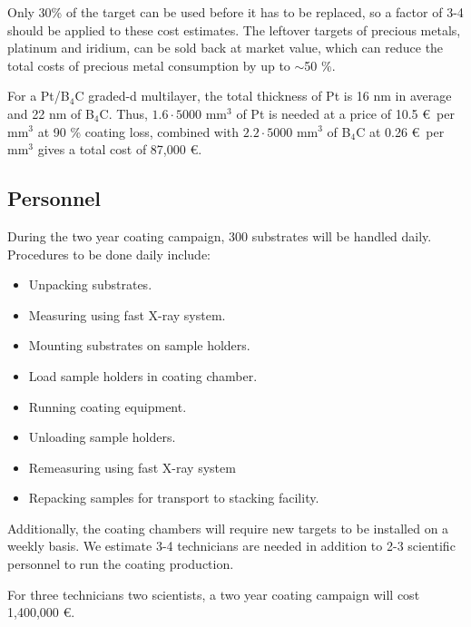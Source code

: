 Only 30\% of the target can be used before it has to be replaced, so a factor of 3-4 should be applied to these cost estimates. The leftover targets of precious metals, platinum and iridium, can be sold back at market value, which can reduce the total costs of precious metal consumption by up to $\sim$50 \%.

For a Pt/B$_4$C graded-d multilayer, the total thickness of Pt is 16 nm in average and 22 nm of B$_4$C. Thus, $1.6 \cdot 5000$ mm$^3$ of Pt is needed at a price of 10.5 \euro\ per mm$^3$ at 90 \% coating loss, combined with $2.2 \cdot 5000$ mm$^3$ of B$_4$C at 0.26 \euro\ per mm$^3$ gives a total cost of 87,000 \euro.

\subsection{Personnel}
During the two year coating campaign, 300 substrates will be handled daily. Procedures to be done daily include:

\begin{itemize}[itemsep=1.5pt,parsep=1pt]
	\item Unpacking substrates.
	\item Measuring using fast X-ray system.
	\item Mounting substrates on sample holders.
	\item Load sample holders in coating chamber.
	\item Running coating equipment.
	\item Unloading sample holders.
	\item Remeasuring using fast X-ray system
	\item Repacking samples for transport to stacking facility.
\end{itemize}

Additionally, the coating chambers will require new targets to be installed on a weekly basis. We estimate 3-4 technicians are needed in addition to 2-3 scientific personnel to run the coating production.

For three technicians two scientists, a two year coating campaign will cost 1,400,000 \euro.


